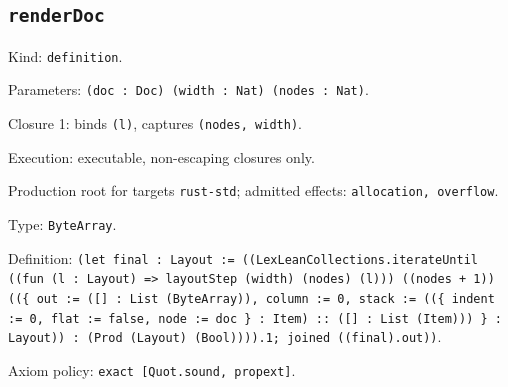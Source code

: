 \documentclass[11pt]{article}
\begin{document}
\subsection*{\texttt{renderDoc}}
\noindent Kind: \texttt{definition}.\par
\noindent Parameters: \texttt{(doc : Doc) (width : Nat) (nodes : Nat)}.\par
\noindent Closure 1: binds \texttt{(l)}, captures \texttt{(nodes, width)}.\par
\noindent Execution: executable, non-escaping closures only.\par
\noindent Production root for targets \texttt{rust-std}; admitted effects: \texttt{allocation, overflow}.\par
\noindent Type: \texttt{ByteArray}.\par
\noindent Definition: \texttt{(let final : Layout := ((LexLeanCollections.iterateUntil ((fun (l : Layout) => layoutStep (width) (nodes) (l))) ((nodes + 1)) ((\{ out := ([] : List (ByteArray)), column := 0, stack := ((\{ indent := 0, flat := false, node := doc \} : Item) :: ([] : List (Item))) \} : Layout)) : (Prod (Layout) (Bool)))).1; joined ((final).out))}.\par
\noindent Axiom policy: \texttt{exact [Quot.sound, propext]}.\par
\end{document}
